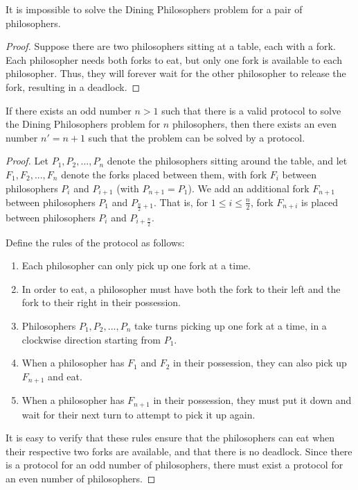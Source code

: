 \documentclass[manuscript,screen,review]{acmart}
\begin{document}
\begin{claim}
  It is impossible to solve the Dining Philosophers problem for a pair of philosophers.
\end{claim}
\begin{proof} 
  Suppose there are two philosophers sitting at a table, each with a fork. Each philosopher needs both forks to eat, but only one fork is available to each philosopher. Thus, they will forever wait for the other philosopher to release the fork, resulting in a deadlock.
\end{proof}
\begin{claim} If there exists an odd number $n > 1$ such that there is a valid protocol to solve the Dining Philosophers problem for $n$ philosophers, then there exists an even number $n' = n + 1$ such that the problem can be solved by a protocol.
\end{claim}
\begin{proof}
Let $P_1, P_2, ..., P_n$ denote the philosophers sitting around the table, and let $F_1, F_2, ..., F_n$ denote the forks placed between them, with fork $F_i$ between philosophers $P_i$ and $P_{i+1}$ (with $P_{n+1} = P_1$). We add an additional fork $F_{n+1}$ between philosophers $P_1$ and $P_{\frac{n}{2}+1}$. That is, for $1\leq i\leq \frac{n}{2}$, fork $F_{n+i}$ is placed between philosophers $P_i$ and $P_{i+\frac{n}{2}}$.

Define the rules of the protocol as follows: 

\begin{enumerate}
  
  \item Each philosopher can only pick up one fork at a time.
  
  \item In order to eat, a philosopher must have both the fork to their left and the fork to their right in their possession.
  
  \item Philosophers $P_1, P_2, ..., P_n$ take turns picking up one fork at a time, in a clockwise direction starting from $P_1$. 
  
  \item When a philosopher has $F_1$ and $F_2$ in their possession, they can also pick up $F_{n+1}$ and eat.
  
  \item When a philosopher has $F_{n+1}$ in their possession, they must put it down and wait for their next turn to attempt to pick it up again.
  
\end{enumerate}

It is easy to verify that these rules ensure that the philosophers can eat when their respective two forks are available, and that there is no deadlock. Since there is a protocol for an odd number of philosophers, there must exist a protocol for an even number of philosophers.
\end{proof}
\end{document}
